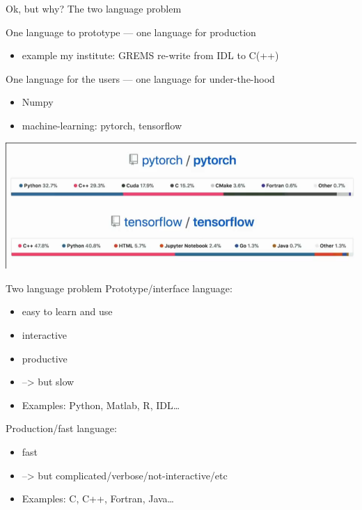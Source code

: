 \documentclass[compress,presentation,aspectratio=169]{beamer}
\begin{document}
\begin{frame}[label={sec:orgeb77589}]{Ok, but why?}
  \footnotesize
\alert{The two language problem}

\begin{block}{One language to prototype   ---  one language for production}
\begin{itemize}
\item example my institute: GREMS re-write from IDL to C(++)
\end{itemize}
\end{block}

\begin{block}{One language for the users  ---  one language for under-the-hood}
\begin{itemize}
\item Numpy
\item machine-learning: pytorch, tensorflow
\end{itemize}

\begin{center}
\includegraphics[width=.7\linewidth]{./figs/ml.png}
\end{center}
\end{block}
\end{frame}

\begin{frame}[label={sec:orgb7aee9c}]{Two language problem}
  \footnotesize
Prototype/interface language:
\begin{itemize}
\item easy to learn and use
\item interactive
\item productive
\item --> \alert{but slow}
\item Examples: Python, Matlab, R, IDL\ldots{}
\end{itemize}

Production/fast language:
\begin{itemize}
\item fast
\item --> \alert{but} complicated/verbose/not-interactive/etc
\item Examples: C, C++, Fortran, Java\ldots{}
\end{itemize}
\end{frame}
\end{document}
